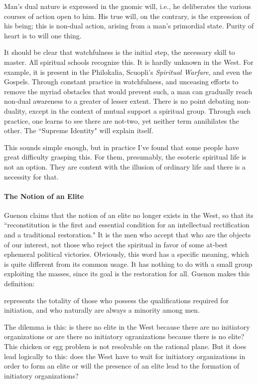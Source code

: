 Man's dual nature is expressed in the gnomic will, i.e., he deliberates the various courses of action open to him. His true will, on the contrary, is the expression of his being; this is non-dual action, arising from a man's primordial state. Purity of heart is to will one thing.

It should be clear that watchfulness is the initial step, the necessary skill to master. All spiritual schools recognize this. It is hardly unknown in the West. For example, it is present in the Philokalia, Scuopli's \textit{Spiritual Warfare}, and even the Gospels. Through constant practice in watchfulness, and unceasing efforts to remove the myriad obstacles that would prevent such, a man can gradually reach non-dual awareness to a greater of lesser extent. There is no point debating non-duality, except in the context of mutual support a spiritual group. Through such practice, one learns to see there are not-two, yet neither term annihilates the other. The ``Supreme Identity" will explain itself.

This sounds simple enough, but in practice I've found that some people have great difficulty grasping this. For them, presumably, the esoteric spiritual life is not an option. They are content with the illusion of ordinary life and there is a necessity for that.

\paragraph{The Notion of an Elite}
Guenon claims that the notion of an elite no longer exists in the West, so that its ``reconstitution is the first and essential condition for an intellectual rectification and a traditional restoration." It is the men who accept that who are the objects of our interest, not those who reject the spiritual in favor of some at-best ephemeral political victories. Obviously, this word has a specific meaning, which is quite different from its common usage. It has nothing to do with a small group exploiting the masses, since its goal is the restoration for all. Guenon makes this definition:

\begin{quotex}
 represents the totality of those who possess the qualifications required for initiation, and who naturally are always a minority among men. 

\end{quotex}
The dilemma is this: is there no elite in the West because there are no initiatory organizations or are there no initiatory ogranizations because there is no elite? This chicken or egg problem is not resolvable on the rational plane. But it does lead logically to this: does the West have to wait for initiatory organizations in order to form an elite or will the presence of an elite lead to the formation of initiatory organizations?

